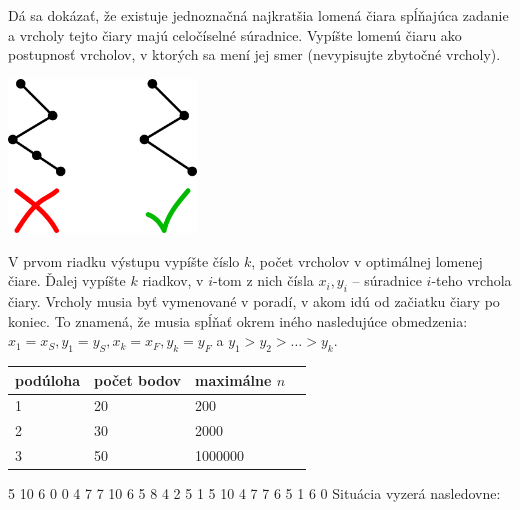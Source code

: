 
Dá sa dokázať, že existuje jednoznačná najkratšia lomená čiara spĺňajúca zadanie a vrcholy tejto
čiary majú celočíselné súradnice. Vypíšte lomenú čiaru ako postupnosť vrcholov, v ktorých sa
mení jej smer (nevypisujte zbytočné vrcholy).

\begin{center}
\includegraphics[width=5cm]{img/skiing1}
\end{center}

V prvom riadku výstupu vypíšte číslo $k$, počet vrcholov v optimálnej lomenej čiare. Ďalej vypíšte
$k$ riadkov, v $i$-tom z nich čísla $x_i, y_i$ -- súradnice $i$-teho vrchola čiary. Vrcholy musia
byť vymenované v poradí, v akom idú od začiatku čiary po koniec. To znamená, že musia spĺňať okrem
iného nasledujúce obmedzenia: $x_1 = x_S, y_1 = y_S, x_k = x_F, y_k = y_F$ a $y_1 > y_2 > \dots > y_k$.


\begin{center}
\begin{tabular}{|l|l|l|l|}
\hline
podúloha & počet bodov & maximálne $n$                 \\ \hline
1       & 20     & 200                                          \\ \hline
2       & 30     & 2000                                         \\ \hline
3       & 50     & 1000000                                        \\ \hline
\end{tabular}
\end{center}



5 10 6 0
0 4 7
7 10 6
5 8 4
2 5 1
5 10
4 7
7 6
5 1
6 0
\sampleCOMMENT
Situácia vyzerá nasledovne:
\sampleEND
{}


